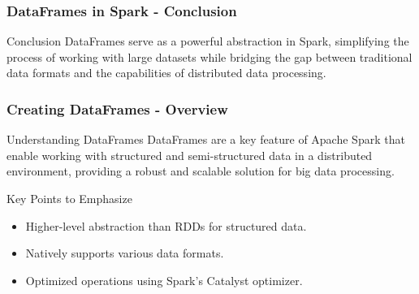 \documentclass[aspectratio=169]{beamer}
\begin{document}
\begin{frame}[fragile]
    \frametitle{DataFrames in Spark - Conclusion}
    \begin{block}{Conclusion}
        DataFrames serve as a powerful abstraction in Spark, simplifying the process of working with large datasets while bridging the gap between traditional data formats and the capabilities of distributed data processing.
    \end{block}
\end{frame}

\begin{frame}[fragile]
    \frametitle{Creating DataFrames - Overview}
    \begin{block}{Understanding DataFrames}
        DataFrames are a key feature of Apache Spark that enable working with structured and semi-structured data in a distributed environment, providing a robust and scalable solution for big data processing.
    \end{block}
    \begin{block}{Key Points to Emphasize}
        \begin{itemize}
            \item Higher-level abstraction than RDDs for structured data.
            \item Natively supports various data formats.
            \item Optimized operations using Spark's Catalyst optimizer.
        \end{itemize}
    \end{block}
\end{frame}
\end{document}
